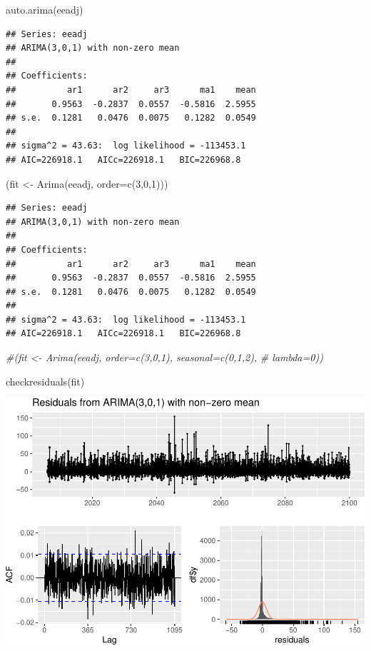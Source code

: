 \documentclass[
  paper=a4,
  ,captions=tableheading
]{scrartcl}
\newenvironment{Shaded}{\begin{snugshade}}{\end{snugshade}}
\newcommand{\AttributeTok}[1]{\textcolor[rgb]{0.77,0.63,0.00}{#1}}
\newcommand{\CommentTok}[1]{\textcolor[rgb]{0.56,0.35,0.01}{\textit{#1}}}
\newcommand{\DecValTok}[1]{\textcolor[rgb]{0.00,0.00,0.81}{#1}}
\newcommand{\FunctionTok}[1]{\textcolor[rgb]{0.00,0.00,0.00}{#1}}
\newcommand{\NormalTok}[1]{#1}
\newcommand{\OtherTok}[1]{\textcolor[rgb]{0.56,0.35,0.01}{#1}}
\begin{document}
\begin{Shaded}
\begin{Highlighting}[]
\FunctionTok{auto.arima}\NormalTok{(eeadj)}
\end{Highlighting}
\end{Shaded}

\begin{verbatim}
## Series: eeadj 
## ARIMA(3,0,1) with non-zero mean 
## 
## Coefficients:
##          ar1      ar2     ar3      ma1    mean
##       0.9563  -0.2837  0.0557  -0.5816  2.5955
## s.e.  0.1281   0.0476  0.0075   0.1282  0.0549
## 
## sigma^2 = 43.63:  log likelihood = -113453.1
## AIC=226918.1   AICc=226918.1   BIC=226968.8
\end{verbatim}

\begin{Shaded}
\begin{Highlighting}[]
\NormalTok{(fit }\OtherTok{\textless{}{-}} \FunctionTok{Arima}\NormalTok{(eeadj, }\AttributeTok{order=}\FunctionTok{c}\NormalTok{(}\DecValTok{3}\NormalTok{,}\DecValTok{0}\NormalTok{,}\DecValTok{1}\NormalTok{)))}
\end{Highlighting}
\end{Shaded}

\begin{verbatim}
## Series: eeadj 
## ARIMA(3,0,1) with non-zero mean 
## 
## Coefficients:
##          ar1      ar2     ar3      ma1    mean
##       0.9563  -0.2837  0.0557  -0.5816  2.5955
## s.e.  0.1281   0.0476  0.0075   0.1282  0.0549
## 
## sigma^2 = 43.63:  log likelihood = -113453.1
## AIC=226918.1   AICc=226918.1   BIC=226968.8
\end{verbatim}

\begin{Shaded}
\begin{Highlighting}[]
\CommentTok{\#(fit \textless{}{-} Arima(eeadj, order=c(3,0,1), seasonal=c(0,1,2),}
\CommentTok{\#  lambda=0))}

\FunctionTok{checkresiduals}\NormalTok{(fit)}
\end{Highlighting}
\end{Shaded}

\includegraphics{Haskell_files/figure-latex/unnamed-chunk-90-1.pdf}
\end{document}
